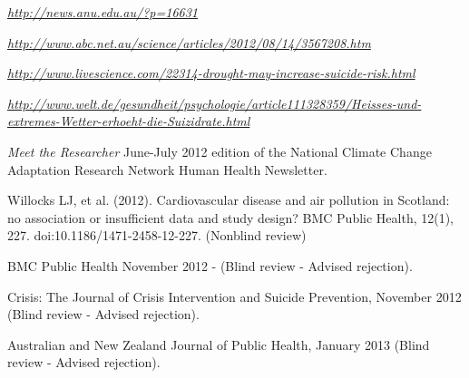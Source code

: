 \documentclass[a4paper,11pt]{article}
\begin{document}

\medskip
\renewcommand{\labelenumi}{\textsc{g}\theenumi.}
\begin{revnumerate}

\item \emph{\href{http://news.anu.edu.au/?p=16631}{http://news.anu.edu.au/?p=16631}}

\item \emph{\href{http://www.abc.net.au/science/articles/2012/08/14/3567208.htm}{http://www.abc.net.au/science/articles/2012/08/14/3567208.htm}}

\item \emph{\href{http://www.livescience.com/22314-drought-may-increase-suicide-risk.html}{http://www.livescience.com/22314-drought-may-increase-suicide-risk.html}}

\item \emph{\href{http://www.welt.de/gesundheit/psychologie/article111328359/Heisses-und-extremes-Wetter-erhoeht-die-Suizidrate.html}{http://www.welt.de/gesundheit/psychologie/article111328359/Heisses-und-extremes-Wetter-erhoeht-die-Suizidrate.html}}

\item \emph{Meet the Researcher} June-July 2012 edition of the National Climate Change Adaptation Research Network Human Health Newsletter.
\end{revnumerate}

\medskip
\renewcommand{\labelenumi}{\textsc{h}\theenumi.}
\begin{revnumerate}

\item Willocks LJ, et al. (2012). Cardiovascular disease and air pollution in Scotland: no association or insufficient data and study design? BMC Public Health, 12(1), 227. doi:10.1186/1471-2458-12-227. (Nonblind review)

\item BMC Public Health November 2012 - (Blind review - Advised rejection).

\item Crisis: The Journal of Crisis Intervention and Suicide Prevention, November 2012 (Blind review - Advised rejection).

\item Australian and New Zealand Journal of Public Health, January 2013 (Blind review - Advised rejection).

\end{revnumerate}
\end{document}
